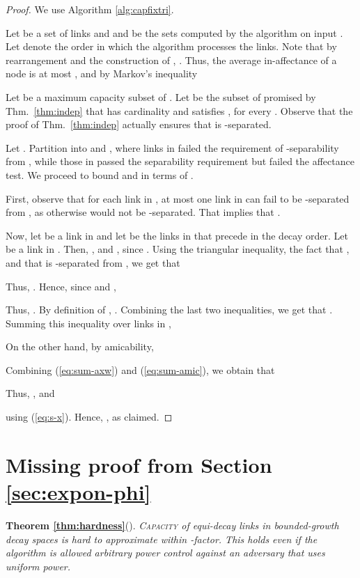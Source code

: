 \documentclass[11pt]{amsart}
\newcommand{\prob}[1]{\textsc{#1}}
\begin{document}
\begin{proof}
We use Algorithm \ref{alg:capfixtri}.


Let  be a set of links and  and  be the sets computed by the
algorithm on input . 
Let  denote the order in which the algorithm processes the links.
Note that by rearrangement and the construction of
, .  Thus, the average
in-affectance of a node is at most , and by Markov's inequality

Let  be a maximum capacity subset of . Let  be the subset of  promised by Thm.~\ref{thm:indep} that has
cardinality  and satisfies , for every .  Observe that the proof of
Thm.~\ref{thm:indep} actually ensures that  is
-separated.

Let .  Partition  into  and , where
links in  failed the requirement of -separability from
, while those in  passed the separability requirement but failed
the affectance test. We proceed to bound  and  in terms of .

First, observe that for each link  in , at most one link in
 can fail to be -separated from , as otherwise
 would not be -separated.  That implies that .

Now, let  be a link in  and let  be the links in  that precede  in the decay
order.  Let  be a link in .
Then, ,  and ,
since .
Using the triangular inequality, the fact that ,
and that  is -separated from , we get that

Thus, .
Hence, since  and , 

Thus, .
By definition of , .  
Combining the last two inequalities, we get that 
.
Summing this inequality over links in ,

On the other hand, by amicability,

Combining (\ref{eq:sum-axw}) and (\ref{eq:sum-amic}),
we obtain that

Thus, ,
and

using (\ref{eq:s-x}). Hence, 
,
as claimed.
\end{proof}

\section{Missing proof from Section \ref{sec:expon-phi}}



\noindent\textbf{Theorem \ref{thm:hardness}}(\cite{GHWW09}).\emph{
\prob{Capacity} of equi-decay links in bounded-growth decay spaces
is hard to approximate within -factor.
This holds even if the algorithm is allowed 
arbitrary power control against an adversary that uses uniform power.
} 
\end{document}
